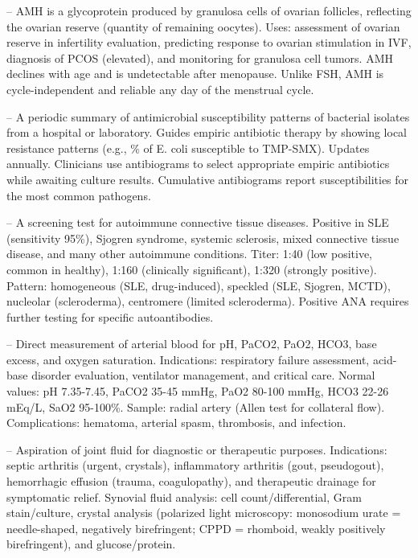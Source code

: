 -- AMH is a glycoprotein produced by granulosa cells of ovarian follicles, reflecting the ovarian reserve (quantity of remaining oocytes). Uses: assessment of ovarian reserve in infertility evaluation, predicting response to ovarian stimulation in IVF, diagnosis of PCOS (elevated), and monitoring for granulosa cell tumors. AMH declines with age and is undetectable after menopause. Unlike FSH, AMH is cycle-independent and reliable any day of the menstrual cycle.

-- A periodic summary of antimicrobial susceptibility patterns of bacterial isolates from a hospital or laboratory. Guides empiric antibiotic therapy by showing local resistance patterns (e.g., \% of E. coli susceptible to TMP-SMX). Updates annually. Clinicians use antibiograms to select appropriate empiric antibiotics while awaiting culture results. Cumulative antibiograms report susceptibilities for the most common pathogens.

-- A screening test for autoimmune connective tissue diseases. Positive in SLE (sensitivity 95\%), Sjogren syndrome, systemic sclerosis, mixed connective tissue disease, and many other autoimmune conditions. Titer: 1:40 (low positive, common in healthy), 1:160 (clinically significant), 1:320 (strongly positive). Pattern: homogeneous (SLE, drug-induced), speckled (SLE, Sjogren, MCTD), nucleolar (scleroderma), centromere (limited scleroderma). Positive ANA requires further testing for specific autoantibodies.

-- Direct measurement of arterial blood for pH, PaCO2, PaO2, HCO3, base excess, and oxygen saturation. Indications: respiratory failure assessment, acid-base disorder evaluation, ventilator management, and critical care. Normal values: pH 7.35-7.45, PaCO2 35-45 mmHg, PaO2 80-100 mmHg, HCO3 22-26 mEq/L, SaO2 95-100\%. Sample: radial artery (Allen test for collateral flow). Complications: hematoma, arterial spasm, thrombosis, and infection.

-- Aspiration of joint fluid for diagnostic or therapeutic purposes. Indications: septic arthritis (urgent, crystals), inflammatory arthritis (gout, pseudogout), hemorrhagic effusion (trauma, coagulopathy), and therapeutic drainage for symptomatic relief. Synovial fluid analysis: cell count/differential, Gram stain/culture, crystal analysis (polarized light microscopy: monosodium urate = needle-shaped, negatively birefringent; CPPD = rhomboid, weakly positively birefringent), and glucose/protein.

